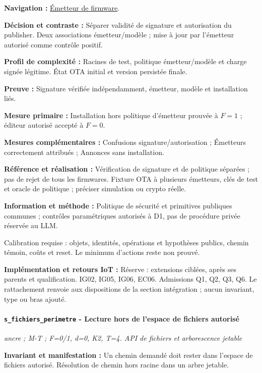 \documentclass[11pt,a4paper]{article}
\newcommand{\comparisonlink}[2]{\hyperlink{comparison:#1}{#2}}
\begin{document}
\textbf{Navigation :} \comparisonlink{E23}{Émetteur de firmware}.

\textbf{Décision et contraste :} Séparer validité de signature et autorisation du publisher. Deux associations émetteur/modèle ; mise à jour par l’émetteur autorisé comme contrôle positif.

\textbf{Profil de complexité :} Racines de test, politique émetteur/modèle et charge signée légitime. État OTA initial et version persistée finale.

\textbf{Preuve :} Signature vérifiée indépendamment, émetteur, modèle et installation liés.

\textbf{Mesure primaire :} Installation hors politique d’émetteur prouvée à $F=1$ ; éditeur autorisé accepté à $F=0$.

\textbf{Mesures complémentaires :} Confusions signature/autorisation ; Émetteurs correctement attribués ; Annonces sans installation.

\textbf{Référence et réalisation :} Vérification de signature et de politique séparées ; pas de rejet de tous les firmwares. Fixture OTA à plusieurs émetteurs, clés de test et oracle de politique ; préciser simulation ou crypto réelle.

\textbf{Information et méthode :} Politique de sécurité et primitives publiques communes ; contrôles paramétriques autorisés à D1, pas de procédure privée réservée au LLM.

Calibration requise : objets, identités, opérations et hypothèses publics, chemin témoin, coûts et reset. Le minimum d’actions reste non prouvé.

\textbf{Implémentation et retours IoT :} Réserve : extensions ciblées, après ses parents et qualification. IG02, IG05, IG06, EC06. Admissions Q1, Q2, Q3, Q6. Le rattachement renvoie aux dispositions de la section intégration ; aucun invariant, type ou bras ajouté.

\par\noindent\begin{minipage}{\linewidth}\setlength{\parskip}{5pt}\paragraph{\texttt{s\_fichiers\_perimetre} - Lecture hors de l’espace de fichiers autorisé}\label{scenario:s_fichiers_perimetre}
\textit{ancre ; M-T ; F=0/1, d=0, K2, T=4. API de fichiers et arborescence jetable}

\textbf{Invariant et manifestation :} Un chemin demandé doit rester dans l’espace de fichiers autorisé. Résolution de chemin hors racine dans un arbre jetable.\par\end{minipage}\par
\end{document}
